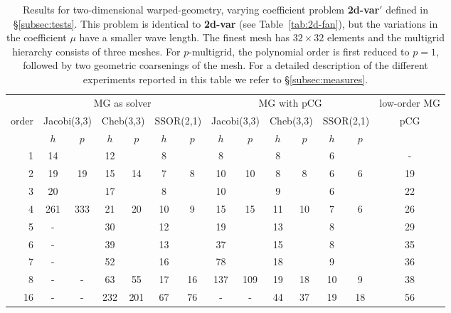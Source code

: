 \documentclass[smallcondensed,final]{svjour3}     %
\begin{document}
\begin{table}
  \caption{\label{tab:2d-fan2} Results for two-dimensional
    warped-geometry, varying coefficient problem {\bf 2d-var$'$}
    defined in \S\ref{subsec:tests}. This problem is identical to {\bf
      2d-var} (see Table~\ref{tab:2d-fan}),
    but the variations in the coefficient $\mu$ have a smaller wave length.
    The finest
    mesh has $32\times 32$ elements and the multigrid hierarchy
    consists of three meshes.  For $p$-multigrid, the
    polynomial order is first reduced to $p=1$, followed by two
    geometric coarsenings of the mesh.
    For a detailed description of the different experiments
    reported in this table we refer to \S\ref{subsec:measures}.} 
  \centering
  \begin{tabular}{|r|c c|c c|c c||c c|c c|c c||c|} 
    \hline
    & \multicolumn{6}{c||}{MG as solver} & \multicolumn{6}{c||}{MG
      with pCG} & \!\!low-order MG\!\! \\
    \cline{2-13}
    \!\!\! order \!\!\!\! &  \multicolumn{2}{c|}{\!\!\scriptsize  Jacobi(3,3)\!\!} &  \multicolumn{2}{c|}{\!\!\scriptsize Cheb(3,3)\!\!} & \multicolumn{2}{c||}{\!\!\scriptsize  SSOR(2,1)\!\!} & \multicolumn{2}{c|}{\!\!\scriptsize Jacobi(3,3)\!\!} &  \multicolumn{2}{c|}{\!\!\scriptsize Cheb(3,3)\!\!} & \multicolumn{2}{c||}{\!\!\scriptsize SSOR(2,1)\!\!} & pCG \\
\hline
 & $h$ & $p$ & $h$ & $p$& $h$ & $p$& $h$ & $p$& $h$ & $p$& $h$ & $p$& ~ \\
 \cline{2-13}
					1 & 14 & & 12 & & 8 & & 8 & & 8 & & 6 & & -  \\
					2 & 19 & 19 & 15 & 14 & 7 & 8 & 10 & 10 & 8 & 8 & 6 & 6 & 19 \\
					3 & 20 & & 17 & & 8 & & 10 & & 9 & & 6 & & 22  \\
					4 & 261 & 333 & 21 & 20 & 10 & 9 & 15 & 15 & 11 & 10 & 7 & 6 & 26  \\
					5 & - & & 30 & & 12 & & 19 & & 13 & & 8 & &  29  \\
					6 & - & & 39 & & 13 & & 37 & & 15 & & 8 & &  35  \\
					7 & - & & 52 & & 16 & & 78 & & 18 & & 9 & &  36  \\
					8 & - & - & 63 & 55   & 17 & 16 & 137 & 109 & 19 & 18 & 10 & 9  & 38 \\
				 16 & - & - & 232 & 201 & 67 & 76 &  -  &  -  & 44 & 37 & 19 & 18 & 56 \\
\hline
  \end{tabular}
\end{table}
\end{document}
